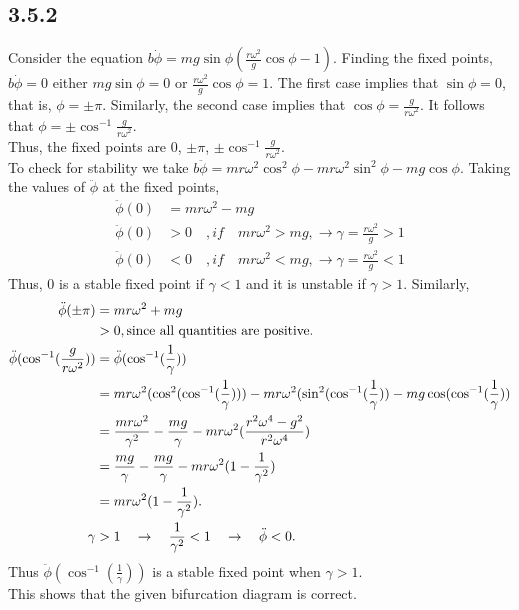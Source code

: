 \documentclass[]{article}
\begin{document}
	\subsection*{3.5.2}
	Consider the equation $b\dot{\phi} = mg\sin\phi (\frac{r \omega^2}{g}\cos \phi -1)$. Finding the fixed points, $b\dot{\phi} = 0$ either $mg\sin\phi = 0$ or $\frac{r \omega^2}{g}\cos \phi = 1$. The first case implies that $\sin \phi = 0$, that is, $\phi = \pm \pi$. Similarly, the second case implies that $\cos \phi = \frac{g}{r \omega^2}$. It follows that $\phi = \pm \cos^{-1} \frac{g}{r \omega^2}$.\\
	Thus, the fixed points are 0, $\pm \pi$, $\pm \cos^{-1}\frac{g}{r \omega^2}$.\\
	To check for stability we take $b\ddot{\phi} = mr\omega^2 \cos^2\phi - mr\omega^2\sin^2\phi - mg\cos\phi$. Taking the values of $\ddot{\phi}$ at the fixed points,\\
	\begin{align*}
	\ddot{\phi}(0) &= mr\omega^2 - mg\\  
	\ddot{\phi}(0) &> 0 \quad, if \quad mr\omega^2 > mg, \rightarrow \gamma = \frac{r\omega^2}{g} > 1\\ 
	\ddot{\phi}(0) &< 0 \quad, if \quad mr\omega^2 < mg, \rightarrow \gamma = \frac{r\omega^2}{g} < 1
	\end{align*}
	Thus, 0 is a stable fixed point if $\gamma < 1$ and it is unstable if $\gamma > 1$. Similarly,
	\begin{align*}
	\ddot{\phi}(\pm \pi) &= mr\omega^2 + mg\\
	&> 0, \textmd{since  all quantities are positive.}\\
	\ddot{\phi}(\cos^{-1} (\frac{g}{r\omega^2})) &= \ddot{\phi}(\cos^{-1} (\frac{1}{\gamma}))\\
	&= mr\omega^2(\cos^2(\cos^{-1}(\frac{1}{\gamma}))) - mr\omega^2(\sin^2(\cos^{-1}(\frac{1}{\gamma})) - mg\cos(\cos^{-1}(\frac{1}{\gamma}))\\
	&= \frac{mr\omega^2}{\gamma^2} - \frac{mg}{\gamma} - mr\omega^2(\frac{r^2\omega^4 - g^2}{r^2\omega^4})\\
	&= \frac{mg}{\gamma} - \frac{mg}{\gamma} - mr\omega^2 (1 - \frac{1}{\gamma^2})\\
	&=mr\omega^2 (1 - \frac{1}{\gamma^2}).\\
	\gamma &> 1 \quad \rightarrow \quad \frac{1}{\gamma^2} < 1 \quad \rightarrow \quad \ddot{\phi} < 0.
	\end{align*}
	Thus $\ddot{\phi}(\cos^{-1} (\frac{1}{\gamma}))$ is a stable fixed point when $\gamma > 1$.\\
	This shows that the given bifurcation diagram is correct.
	
\end{document}
